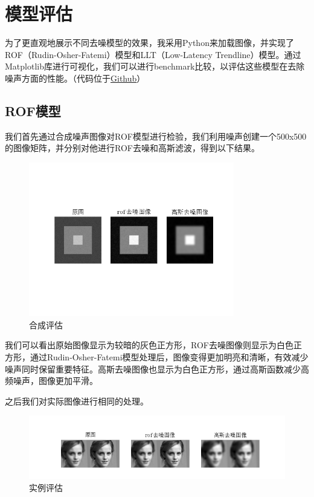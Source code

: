 \titleformat{\chapter}[hang]{\linespread{1}\heiti\sanhao\bfseries\filright}{\thechapter}{1em}{}{}
\renewcommand*{\thefigure}{\arabic{figure}}
\chapter{模型评估}
为了更直观地展示不同去噪模型的效果，我采用Python来加载图像，并实现了ROF（Rudin-Osher-Fatemi）模型和LLT（Low-Latency Trendline）模型。通过Matplotlib库进行可视化，我们可以进行benchmark比较，以评估这些模型在去除噪声方面的性能。（代码位于\href{https://github.com/mysciz/MPE}{Github}）

\section{ROF模型}
我们首先通过合成噪声图像对ROF模型进行检验，我们利用噪声创建一个500x500的图像矩阵，并分别对他进行ROF去噪和高斯滤波，得到以下结果。
\vspace{-1em}
\begin{figure}[h]
    \centering
    \includegraphics[width=0.8\textwidth]{Images/合成评估.png}
    \vspace{-7em}
    \caption{合成评估}
    \label{fig:synthesis_evaluation}
\end{figure}
我们可以看出原始图像显示为较暗的灰色正方形，ROF去噪图像则显示为白色正方形，通过Rudin-Osher-Fatemi模型处理后，图像变得更加明亮和清晰，有效减少噪声同时保留重要特征。高斯去噪图像也显示为白色正方形，通过高斯函数减少高频噪声，图像更加平滑。

之后我们对实际图像进行相同的处理。
\begin{figure}[ht]
    \centering
    \includegraphics[width=1\textwidth]{Images/real.png}
    \vspace{-2em}
    \caption{实例评估}
    \label{fig:synthesis_evaluation}
\end{figure}
\FloatBarrier


